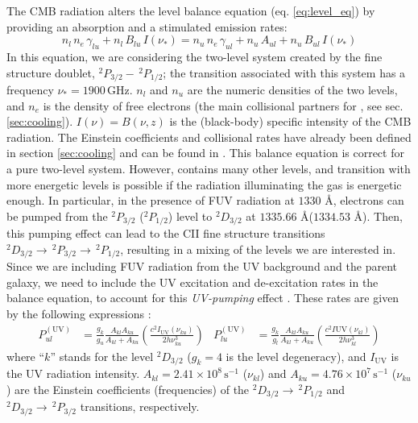 The CMB radiation alters the level balance equation (eq. \ref{eq:level_eq}) by providing an absorption and a stimulated emission rates:
\begin{equation}
    n_l \,n_e\,\gamma_{lu} + n_l \,B_{lu}\, I(\nu_*) = n_u\,n_e\,\gamma_{ul} + n_u\,A_{ul} + n_u\, B_{ul} \,I(\nu_*)
\end{equation}
In this equation, we are considering the two-level system created by the \CIIion fine structure doublet, $^2P_{3/2}-\,^2P_{1/2}$; the transition associated with this system has a frequency $\nu_* = 1900\,\mathrm{GHz}$. $n_l$ and $n_u$ are the numeric densities of the two levels, and $n_e$ is the density of free electrons (the main collisional partners for \CII, see sec. \ref{sec:cooling}). $I(\nu) = B(\nu, z)$ is the (black-body) specific intensity of the CMB radiation. The Einstein coefficients and collisional rates have already been defined in section \ref{sec:cooling} and can be found in \citet{gong2012}. This balance equation is correct for a pure two-level system. However, \CII contains many other levels, and transition with more energetic levels is possible if the radiation illuminating the gas is energetic enough. In particular, in the presence of FUV radiation at $1330$ \AA, electrons can be pumped from the $^2P_{3/2}$ ($^2P_{1/2}$) level to $^2D_{3/2}$ at $1335.66$ \AA ($1334.53$ \AA). Then, this pumping effect can lead to the CII fine structure transitions $^2D_{3/2}\rightarrow \,^2 P_{3/2} \rightarrow \,^2 P_{1/2}$, resulting in a mixing of the levels we are interested in. Since we are including FUV radiation from the UV background and the parent galaxy, we need to include the UV excitation and de-excitation rates in the balance equation, to account for this \textit{UV-pumping} effect \citep[for more details, see][]{gong2012, vallini2015, kohandel:2019}. These rates are given by the following expressions \citep{field}:
\begin{align}
    P_{ul}^\mathrm{(UV)} &= \frac{g_k}{g_u}\frac{A_{kl}A_{ku}}{A_{kl}+A_{ku}}\left(\frac{c^2 I_\mathrm{UV}(\nu_{ku})}{2h\nu_{ku}^3}\right)&
    P_{lu}^\mathrm{(UV)} &= \frac{g_k}{g_l}\frac{A_{kl}A_{ku}}{A_{kl}+A_{ku}}\left(\frac{c^2 I\mathrm{UV}(\nu_{kl})}{2h\nu_{kl}^3}\right)
\end{align}
where “$k$” stands for the level $^2D_{3/2}$ ($g_k = 4$ is the level degeneracy), and $I_\mathrm{UV}$ is the UV radiation intensity. $A_{kl} = 2.41\times10^8\,\mathrm{s}^{-1}$ ($\nu_{kl}$) and $A_{ku} = 4.76\times 10^7\,\mathrm{s}^{-1}$ ($\nu_{ku}$) are the Einstein
coefficients (frequencies) of the $^2D_{3/2}\rightarrow \,^2P_{1/2}$ and $^2D_{3/2} \rightarrow \,^2P_{3/2}$ transitions, respectively.  

